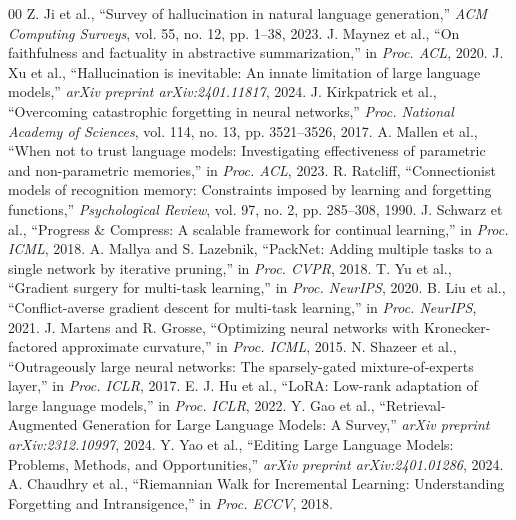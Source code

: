 \documentclass[10pt, conference, letterpaper]{IEEEtran}
\begin{document}
\begin{thebibliography}{00}
 Z. Ji et al., ``Survey of hallucination in natural language generation,'' \textit{ACM Computing Surveys}, vol. 55, no. 12, pp. 1--38, 2023.
 J. Maynez et al., ``On faithfulness and factuality in abstractive summarization,'' in \textit{Proc. ACL}, 2020.
 J. Xu et al., ``Hallucination is inevitable: An innate limitation of large language models,'' \textit{arXiv preprint arXiv:2401.11817}, 2024.
 J. Kirkpatrick et al., ``Overcoming catastrophic forgetting in neural networks,'' \textit{Proc. National Academy of Sciences}, vol. 114, no. 13, pp. 3521--3526, 2017.
 A. Mallen et al., ``When not to trust language models: Investigating effectiveness of parametric and non-parametric memories,'' in \textit{Proc. ACL}, 2023.
 R. Ratcliff, ``Connectionist models of recognition memory: Constraints imposed by learning and forgetting functions,'' \textit{Psychological Review}, vol. 97, no. 2, pp. 285--308, 1990.
 J. Schwarz et al., ``Progress \& Compress: A scalable framework for continual learning,'' in \textit{Proc. ICML}, 2018.
 A. Mallya and S. Lazebnik, ``PackNet: Adding multiple tasks to a single network by iterative pruning,'' in \textit{Proc. CVPR}, 2018.
 T. Yu et al., ``Gradient surgery for multi-task learning,'' in \textit{Proc. NeurIPS}, 2020.
 B. Liu et al., ``Conflict-averse gradient descent for multi-task learning,'' in \textit{Proc. NeurIPS}, 2021.
 J. Martens and R. Grosse, ``Optimizing neural networks with Kronecker-factored approximate curvature,'' in \textit{Proc. ICML}, 2015.
 N. Shazeer et al., ``Outrageously large neural networks: The sparsely-gated mixture-of-experts layer,'' in \textit{Proc. ICLR}, 2017.
 E. J. Hu et al., ``LoRA: Low-rank adaptation of large language models,'' in \textit{Proc. ICLR}, 2022.
 Y. Gao et al., ``Retrieval-Augmented Generation for Large Language Models: A Survey,'' \textit{arXiv preprint arXiv:2312.10997}, 2024.
 Y. Yao et al., ``Editing Large Language Models: Problems, Methods, and Opportunities,'' \textit{arXiv preprint arXiv:2401.01286}, 2024.
 A. Chaudhry et al., ``Riemannian Walk for Incremental Learning: Understanding Forgetting and Intransigence,'' in \textit{Proc. ECCV}, 2018.

\end{thebibliography}
\end{document}
